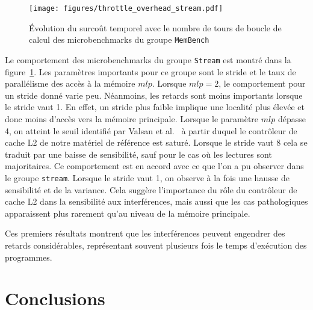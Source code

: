 \begin{figure}[!p]
\texttt{[image: figures/throttle\_overhead\_stream.pdf]}
\caption{\label{fig:throttle_overhead_stream}Évolution du surcoût temporel avec le nombre de tours de boucle de calcul des microbenchmarks du groupe \texttt{MemBench}}
\end{figure}

Le comportement des microbenchmarks du groupe \texttt{Stream} est montré dans la figure~\ref{fig:throttle_overhead_stream}.
Les paramètres importants pour ce groupe sont le stride et le taux de parallélisme des accès à la mémoire $mlp$.
Lorsque $mlp=2$, le comportement pour un stride donné varie peu.
Néanmoins, les retards sont moins importants lorsque le stride vaut 1.
En effet, un stride plus faible implique une localité plus élevée et donc moins d'accès vers la mémoire principale.
Lorsque le paramètre $mlp$ dépasse 4, on atteint le seuil identifié par Valsan et al.~\cite{valsan2016taming} à partir duquel le contrôleur de cache L2 de notre matériel de référence est saturé.
Lorsque le stride vaut 8 cela se traduit par une baisse de sensibilité, sauf pour le cas où les lectures sont majoritaires.
Ce comportement est en accord avec ce que l'on a pu observer dans le groupe \texttt{stream}.
Lorsque le stride vaut 1, on observe à la fois une hausse de sensibilité et de la variance.
Cela suggère l'importance du rôle du contrôleur de cache L2 dans la sensibilité aux interférences, mais aussi que les cas pathologiques apparaissent plus rarement qu'au niveau de la mémoire principale.

Ces premiers résultats montrent que les interférences peuvent engendrer des retards considérables, représentant souvent plusieurs fois le temps d'exécution 
des programmes.

\section{Conclusions}





